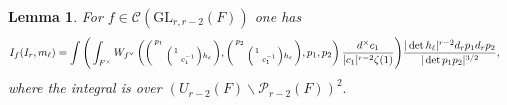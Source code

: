 \documentclass[12pt]{amsart}
\newtheorem{lem}[thm]{Lemma}
\theoremstyle{remark}
\numberwithin{equation}{section}
\newcommand{\GL}{\mathrm{GL}}
\theoremstyle{definition}
\newenvironment{psmatrix}
  {\left(\begin{smallmatrix}}
  {\end{smallmatrix}\right)}
\numberwithin{equation}{subsection}
\begin{document}
\begin{lem} \label{lem:unfold}
For $f \in \mathcal{C}(\GL_{r,r-2}(F))$ one has \begin{align*}
    &I_{f}(I_r,m_{\ell})=\int\Bigg(\int_{F^\times}W_{f^\vee}\left(\begin{psmatrix} p_1 & \\ & \begin{psmatrix} 1 & \\ & c_1^{-1}\end{psmatrix}h_\ell \end{psmatrix},\begin{psmatrix}p_2 & \\ & \begin{psmatrix} 1 & \\ & c_1^{-1}\end{psmatrix}h_\ell \end{psmatrix},p_1,p_2\right)\frac{d^\times c_1}{|c_1|^{r-2}\zeta(1)}\Bigg)\frac{|\det h_\ell|^{r-2}d_r p_1d_r p_2}{|\det p_1 p_2|^{3/2}},
\end{align*} 
where the integral is over $(U_{r-2}(F) \backslash \mathcal{P}_{r-2}(F))^2.$
\end{lem}
\end{document}
